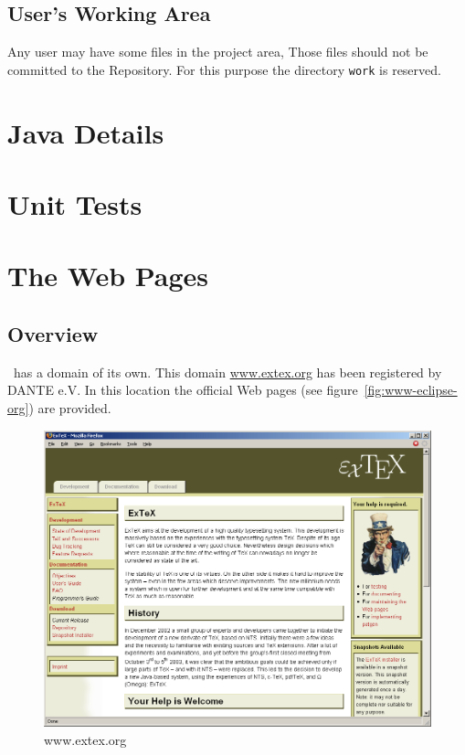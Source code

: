\documentclass{extex-doc}
\begin{document}
\section{User's Working Area}

Any user may have some files in the project area, Those files should
not be committed to the Repository. For this purpose the directory
\texttt{work} is reserved.



\chapter{Java Details}




\chapter{Unit Tests}

\INCOMPLETE




\chapter{The Web Pages}

\section{Overview}

\ExTeX\ has a domain of its own. This domain \url{www.extex.org} has
been registered by DANTE e.V. In this location the official Web pages
(see figure~\ref{fig:www-eclipse-org}) are provided.
\begin{figure}[htb]
  \centering
  \includegraphics[scale=.4]{image/www-extex-org}
  \caption{www.extex.org}\label{fig:www-extex-org}
\end{figure}
\end{document}
